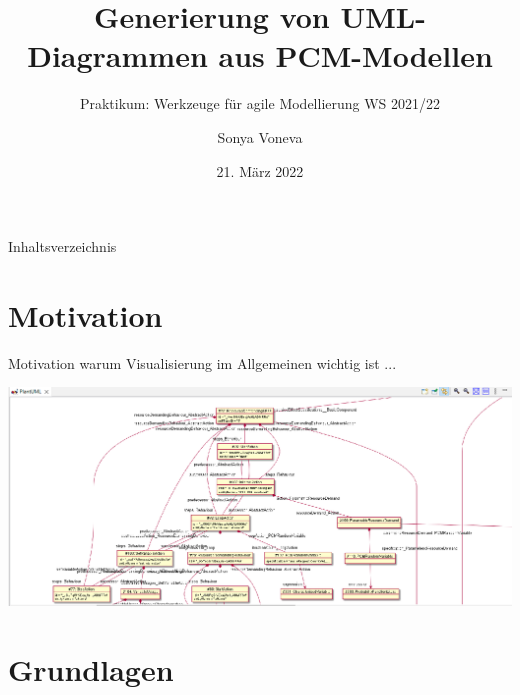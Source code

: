 \documentclass{sdqbeamer}
\title{Generierung von UML-Diagrammen aus PCM-Modellen}
\subtitle{Praktikum: Werkzeuge für agile Modellierung WS 2021/22}
\author{Sonya Voneva}
\date[21.03.22]{21. März 2022}
\begin{document}
\KITtitleframe

\begin{frame}{Inhaltsverzeichnis}
\tableofcontents
\end{frame}

\section{Motivation}
\begin{frame}{Motivation}
warum Visualisierung im Allgemeinen wichtig ist ...
\end{frame}

\begin{frame}[plain]
\includegraphics[width=\textwidth,height=1.1\textheight]{motivation.png}
\end{frame}

\section{Grundlagen}
\end{document}
